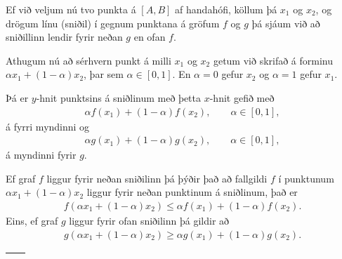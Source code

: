 \documentclass[a4paper,10pt,icelandic]{sphinxmanual}
\begin{document}
Ef við veljum nú tvo punkta á \([A,B]\) af handahófi, köllum þá
\(x_1\) og \(x_2\), og drögum línu (sniðil) í gegnum punktana á
gröfum \(f\) og \(g\) þá sjáum við að sniðillinn lendir fyrir
neðan \(g\) en ofan \(f\).

Athugum nú að sérhvern punkt á milli \(x_1\) og \(x_2\) getum við skrifað á
forminu
\(\alpha x_1 + (1-\alpha)x_2\), þar sem \(\alpha \in [0,1]\). En \(\alpha=0\)
gefur \(x_2\) og \(\alpha=1\) gefur \(x_1\).

Þá er
\(y\)-hnit punktsins á sniðlinum með þetta \(x\)-hnit gefið með
\begin{equation*}
\begin{split}\alpha f(x_1) + (1-\alpha) f(x_2), \qquad \alpha \in [0,1],\end{split}
\end{equation*}
á fyrri myndinni og
\begin{equation*}
\begin{split}\alpha g(x_1) + (1-\alpha) g(x_2), \qquad \alpha \in [0,1],\end{split}
\end{equation*}
á myndinni fyrir \(g\).

Ef graf \(f\) liggur fyrir neðan sniðilinn þá þýðir það að fallgildi
\(f\) í punktunum \(\alpha x_1 + (1-\alpha)x_2\) liggur fyrir
neðan punktinum á sniðlinum, það er
\begin{equation*}
\begin{split}f(\alpha x_1+(1-\alpha)x_2)\leq \alpha f(x_1)+(1-\alpha)f(x_2).\end{split}
\end{equation*}
Eins, ef graf \(g\) liggur fyrir ofan sniðilinn þá gildir að
\begin{equation*}
\begin{split}g(\alpha x_1+(1-\alpha)x_2)\geq \alpha g(x_1)+(1-\alpha)g(x_2).\end{split}
\end{equation*}
\noindent\begin{tabulary}{\linewidth}{|L|L|}
\hline
{}\label{kafli05:figa3}
&\label{kafli05:figb3}
\\
\hline\end{tabulary}
\end{document}
